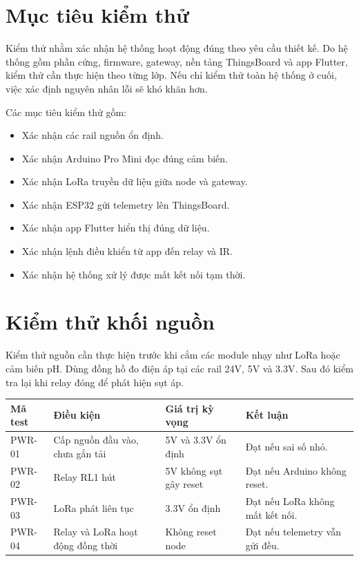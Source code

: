 \section{Mục tiêu kiểm thử}
Kiểm thử nhằm xác nhận hệ thống hoạt động đúng theo yêu cầu thiết kế. Do hệ thống gồm phần cứng, firmware, gateway, nền tảng ThingsBoard và app Flutter, kiểm thử cần thực hiện theo từng lớp. Nếu chỉ kiểm thử toàn hệ thống ở cuối, việc xác định nguyên nhân lỗi sẽ khó khăn hơn.

Các mục tiêu kiểm thử gồm:
\begin{itemize}
    \item Xác nhận các rail nguồn ổn định.
    \item Xác nhận Arduino Pro Mini đọc đúng cảm biến.
    \item Xác nhận LoRa truyền dữ liệu giữa node và gateway.
    \item Xác nhận ESP32 gửi telemetry lên ThingsBoard.
    \item Xác nhận app Flutter hiển thị đúng dữ liệu.
    \item Xác nhận lệnh điều khiển từ app đến relay và IR.
    \item Xác nhận hệ thống xử lý được mất kết nối tạm thời.
\end{itemize}

\section{Kiểm thử khối nguồn}
Kiểm thử nguồn cần thực hiện trước khi cắm các module nhạy như LoRa hoặc cảm biến pH. Dùng đồng hồ đo điện áp tại các rail 24V, 5V và 3.3V. Sau đó kiểm tra lại khi relay đóng để phát hiện sụt áp.

\begin{longtable}{|p{3.2cm}|p{3.8cm}|p{3.5cm}|p{3cm}|}
\hline
\textbf{Mã test} & \textbf{Điều kiện} & \textbf{Giá trị kỳ vọng} & \textbf{Kết luận} \\
\hline
PWR-01 & Cấp nguồn đầu vào, chưa gắn tải & 5V và 3.3V ổn định & Đạt nếu sai số nhỏ. \\
\hline
PWR-02 & Relay RL1 hút & 5V không sụt gây reset & Đạt nếu Arduino không reset. \\
\hline
PWR-03 & LoRa phát liên tục & 3.3V ổn định & Đạt nếu LoRa không mất kết nối. \\
\hline
PWR-04 & Relay và LoRa hoạt động đồng thời & Không reset node & Đạt nếu telemetry vẫn gửi đều. \\
\hline
\end{longtable}

